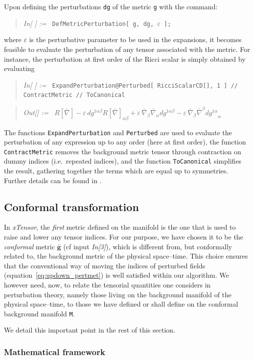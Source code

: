 \documentclass[notitlepage,onecolumn,floatfix,preprintnumbers,aps,prd,showpacs,nofootinbib,amsmath,amssymb,amsfonts]{revtex4-1}
\newcommand{\<}{\langle}
\renewcommand{\>}{\rangle}
\newcounter{inout}
\newcommand{\inoutput}{%
	\stepcounter{inout}%
	\theinout}
\newcommand{\mathIn}[1]{
	\begin{quotation} {\em In[\inoutput] :=\ } {\tt #1} \end{quotation}}
\newcommand{\mathOut}[1]{
	\begin{quotation} {\em Out[\theinout] :=\ } #1 \end{quotation}}
\newcommand{\ttgr}[1]{{#1}}
\newcommand{\bb}{{\ttgr{\alpha}}}
\newcommand{\cc}{{\ttgr{\beta}}}
\begin{document}
Upon defining the perturbations {\tt dg} of the metric {\tt g} with the command: 
%
\mathIn{DefMetricPerturbation[ g, dg, $\varepsilon$ ];}
%
where $\varepsilon$ is the perturbative parameter to be used in the expansions, 
it becomes feasible to evaluate the perturbation of any tensor associated with the metric. 
For instance, the perturbation at first order of the Ricci scalar is simply obtained by evaluating 
%
\mathIn{ExpandPerturbation@Perturbed[ RicciScalarCD[], 1 ]\,//\,ContractMetric\,//\,ToCanonical}
\mathOut{$R[\bar{\nabla}] - \varepsilon \, dg^{1\bb\cc} R[\bar{\nabla}]_{\bb\cc}
	+\varepsilon\, \bar{\nabla}_\cc \bar{\nabla}_\bb dg^{1\bb\cc} - \varepsilon\,
	\bar{\nabla}_\cc \bar{\nabla}^\cc {dg^{1\bb}}_\bb$}
%
The functions {\tt ExpandPerturbation} and {\tt Perturbed} are used to evaluate 
the perturbation of any expression up to any order (here at first order), 
the function {\tt ContractMetric} removes the background metric tensor 
through contraction on dummy indices (i.e.\ repeated indices), and the function {\tt ToCanonical} simplifies the result, 
gathering together the terms which are equal up to symmetries. 
Further details can be found in \cite{Brizuela:2008ra}. 

\subsection{Conformal transformation}

In \textit{xTensor}, the \textit{first} metric defined on the manifold is the one that is used to raise and 
lower any tensor indices. For our purpose, we have chosen it to be the \textit{conformal} metric 
$\bm{\bar g}$ (cf input \textit{In[3]}), which is different from, but conformally related to, 
the background metric of the physical space--time. 
%
This choice ensures that the conventional way of moving the indices of perturbed fields (equation~\eqref{eq:updown_pertmet}) 
is well satisfied within our algorithm. We however need, now, to relate the tensorial quantities one considers in 
perturbation theory, namely those living on the background manifold of the physical space--time, 
to those we have defined or shall define on the conformal background manifold {\tt M}. 

We detail this important point in the rest of this section.

\subsubsection{Mathematical framework}
\end{document}
